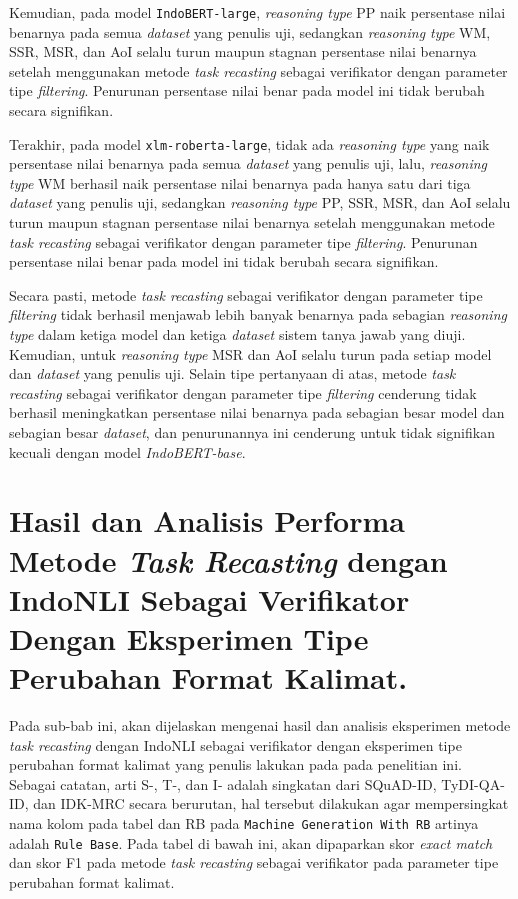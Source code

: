 Kemudian, pada model \texttt{IndoBERT-large}, \emph{reasoning type} PP naik persentase nilai benarnya pada semua \emph{dataset} yang penulis uji, sedangkan \emph{reasoning type} WM, SSR, MSR, dan AoI selalu turun maupun stagnan persentase nilai benarnya setelah menggunakan metode \emph{task recasting} sebagai verifikator dengan parameter tipe \emph{filtering}. Penurunan persentase nilai benar pada model ini tidak berubah secara signifikan.

Terakhir, pada model \texttt{xlm-roberta-large}, tidak ada \emph{reasoning type} yang naik persentase nilai benarnya pada semua \emph{dataset} yang penulis uji, lalu, \emph{reasoning type} WM berhasil naik persentase nilai benarnya pada hanya satu dari tiga \emph{dataset} yang penulis uji, sedangkan \emph{reasoning type} PP, SSR, MSR, dan AoI selalu turun maupun stagnan persentase nilai benarnya setelah menggunakan metode \emph{task recasting} sebagai verifikator dengan parameter tipe \emph{filtering}. Penurunan persentase nilai benar pada model ini tidak berubah secara signifikan.

Secara pasti, metode \emph{task recasting} sebagai verifikator dengan parameter tipe \emph{filtering} tidak berhasil menjawab lebih banyak benarnya pada sebagian \emph{reasoning type} dalam ketiga model dan ketiga \emph{dataset} sistem tanya jawab yang diuji. Kemudian, untuk \emph{reasoning type} MSR dan AoI selalu turun pada setiap model dan \emph{dataset} yang penulis uji. Selain tipe pertanyaan di atas, metode \emph{task recasting} sebagai verifikator dengan parameter tipe \emph{filtering} cenderung tidak berhasil meningkatkan persentase nilai benarnya pada sebagian besar model dan sebagian besar \emph{dataset}, dan penurunannya ini cenderung untuk tidak signifikan kecuali dengan model \emph{IndoBERT-base}.

\section{Hasil dan Analisis Performa Metode \emph{Task Recasting} dengan IndoNLI Sebagai Verifikator Dengan Eksperimen Tipe Perubahan Format Kalimat.}
\label{5.4}
Pada sub-bab ini, akan dijelaskan mengenai hasil dan analisis eksperimen metode \emph{task recasting} dengan IndoNLI sebagai verifikator dengan eksperimen tipe perubahan format kalimat yang penulis lakukan pada pada penelitian ini. Sebagai catatan, arti S-, T-, dan I- adalah singkatan dari SQuAD-ID, TyDI-QA-ID, dan IDK-MRC secara berurutan, hal tersebut dilakukan agar mempersingkat nama kolom pada tabel dan RB pada \texttt{Machine Generation With RB} artinya adalah \texttt{Rule Base}. Pada tabel di bawah ini, akan dipaparkan skor \emph{exact match} dan skor F1 pada metode \emph{task recasting} sebagai verifikator pada parameter tipe perubahan format kalimat.

